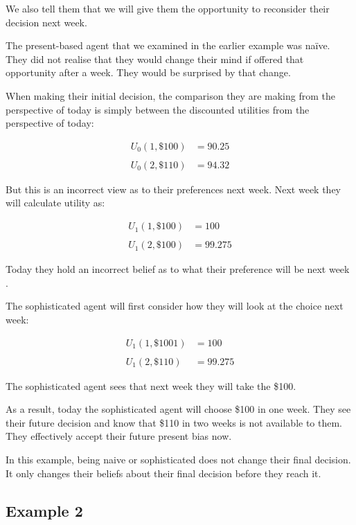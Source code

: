 \documentclass[
  letterpaper,
  DIV=11,
  numbers=noendperiod]{scrreprt}
\begin{document}
We also tell them that we will give them the opportunity to reconsider
their decision next week.

The present-based agent that we examined in the earlier example was
naïve. They did not realise that they would change their mind if offered
that opportunity after a week. They would be surprised by that change.

When making their initial decision, the comparison they are making from
the perspective of today is simply between the discounted utilities from
the perspective of today:

\begin{align*}
U_0(1,\$100)&=90.25 \\
\\
U_0(2,\$110)&=94.32
\end{align*}

But this is an incorrect view as to their preferences next week. Next
week they will calculate utility as:

\begin{align*}
U_1(1,\$100)&=100 \\
\\
U_1(2,\$100)&=99.275
\end{align*}

Today they hold an incorrect belief as to what their preference will be
next week .

The sophisticated agent will first consider how they will look at the
choice next week:

\begin{align*}
U_1(1,\$1001)&=100 \\
\\
U_1(2,\$110)&=99.275
\end{align*}

The sophisticated agent sees that next week they will take the \$100.

As a result, today the sophisticated agent will choose \$100 in one
week. They see their future decision and know that \$110 in two weeks is
not available to them. They effectively accept their future present bias
now.

In this example, being naive or sophisticated does not change their
final decision. It only changes their beliefs about their final decision
before they reach it.

\hypertarget{example-2-4}{%
\subsection{Example 2}\label{example-2-4}}
\end{document}
